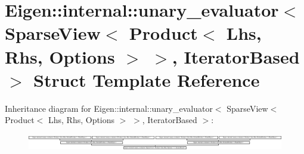 \hypertarget{struct_eigen_1_1internal_1_1unary__evaluator_3_01_sparse_view_3_01_product_3_01_lhs_00_01_rhs_00009027121becdbd7ae7cc0d8a4c63ed7}{}\section{Eigen\+:\+:internal\+:\+:unary\+\_\+evaluator$<$ Sparse\+View$<$ Product$<$ Lhs, Rhs, Options $>$ $>$, Iterator\+Based $>$ Struct Template Reference}
\label{struct_eigen_1_1internal_1_1unary__evaluator_3_01_sparse_view_3_01_product_3_01_lhs_00_01_rhs_00009027121becdbd7ae7cc0d8a4c63ed7}
Inheritance diagram for Eigen\+:\+:internal\+:\+:unary\+\_\+evaluator$<$ Sparse\+View$<$ Product$<$ Lhs, Rhs, Options $>$ $>$, Iterator\+Based $>$\+:\begin{figure}[H]
\begin{center}
\leavevmode
\includegraphics[height=0.738137cm]{struct_eigen_1_1internal_1_1unary__evaluator_3_01_sparse_view_3_01_product_3_01_lhs_00_01_rhs_00009027121becdbd7ae7cc0d8a4c63ed7}
\end{center}
\end{figure}
